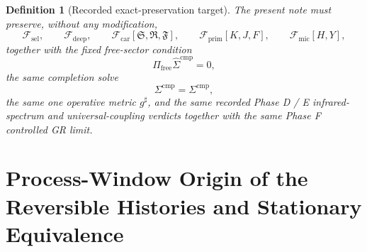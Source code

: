\documentclass[11pt]{article}
\newcommand{\CompletedMetric}{g^{\sharp}}
\newcommand{\CompShift}{\Sigma^{\mathrm{cmp}}}
\newcommand{\CompLift}{\widehat\Sigma^{\mathrm{cmp}}}
\newcommand{\FreeProj}{\Pi_{\mathrm{free}}}
\newcommand{\GaugeAux}{Y}
\newcommand{\MicFunctional}{\mathscr F_{\mathrm{mic}}}
\newcommand{\PrimFunctional}{\mathscr F_{\mathrm{prim}}}
\newcommand{\CarrierFunctional}{\mathscr F_{\mathrm{car}}}
\newcommand{\DeepFunctional}{\mathscr F_{\mathrm{deep}}}
\newcommand{\StemFunctional}{\mathscr F_{\mathrm{sel}}}
\newcommand{\PrimStrain}{K}
\newcommand{\PrimNeutral}{J}
\newcommand{\PrimFree}{F}
\newcommand{\CarrierSeed}{\mathfrak S}
\newcommand{\RelabelSeed}{\mathfrak R}
\newcommand{\FreeSeed}{\mathfrak F}
\newtheorem{definition}{Definition}
\begin{document}
\begin{definition}[Recorded exact-preservation target]
\label{def:recorded_target}
The present note must preserve, without any modification,
\begin{equation}
\StemFunctional,
\qquad
\DeepFunctional,
\qquad
\CarrierFunctional[\CarrierSeed,\RelabelSeed,\FreeSeed],
\qquad
\PrimFunctional[\PrimStrain,\PrimNeutral,\PrimFree],
\qquad
\MicFunctional[H,\GaugeAux],
\label{eq:target_functionals}
\end{equation}
together with the fixed free-sector condition
\begin{equation}
\FreeProj\CompLift=0,
\label{eq:target_free}
\end{equation}
the same completion solve
\begin{equation}
\CompShift=\Sigma^{\mathrm{cmp}},
\label{eq:target_sigma}
\end{equation}
the same one operative metric \(\CompletedMetric\), and the same recorded Phase D / E infrared-spectrum and universal-coupling verdicts together with the same Phase F controlled GR limit.
\end{definition}

\section{Process-Window Origin of the Reversible Histories and Stationary Equivalence}
\end{document}
